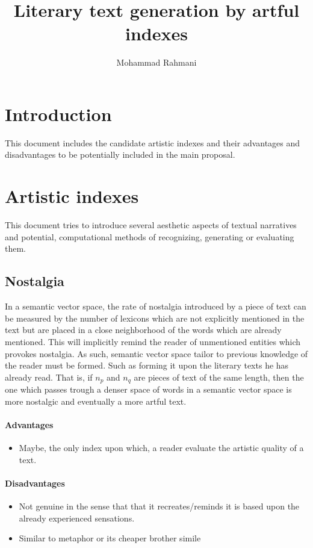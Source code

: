 \documentclass{article}
\begin{document}
	
	\title{Literary text generation by artful indexes}
	\author{Mohammad Rahmani}
	\date{}
	\maketitle
		
		\section{Introduction}\label{sec:introduction}
		This document includes the candidate artistic indexes and their advantages and disadvantages to be potentially included in the main proposal.
		\section{Artistic indexes} \label{sec:artistic-indexes}
		This document tries to introduce several aesthetic aspects of textual narratives and potential, computational methods of recognizing, generating or evaluating them. 
			
			\subsection{Nostalgia} 
			In a semantic vector space, the rate of nostalgia introduced by a piece of text can be measured by the number of lexicons which are not explicitly mentioned in the text but are placed in a close neighborhood of the words which are already mentioned. This will implicitly remind the reader of unmentioned entities which provokes nostalgia. As such, semantic vector space tailor to previous knowledge of the reader must be formed. Such as forming it upon the literary texts he has already read. That is, if $n_p$ and $n_q$ are pieces of text of the same length, then the one which passes trough a denser space of words in a semantic vector space is more nostalgic and eventually a more artful text.
				\paragraph{Advantages}
					\begin{itemize}
						\item Maybe, the only index upon which, a reader evaluate the artistic quality of a text.
					\end{itemize}
				\paragraph{Disadvantages}
					\begin{itemize}
						\item Not genuine in the sense that that it recreates/reminds it is based upon the already experienced sensations. 
						\item Similar to metaphor or its cheaper brother simile    
					\end{itemize}
\end{document}

